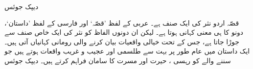 \documentclass[a4paper]{article}
\begin{document}
\RTL
\setlength{\parindent}{0pt}
\setlength{\parskip}{24pt plus 10pt minus 10pt}
\fontsize{36pt}{18pt}
\begin{center}
\fontsize{36pt}{18pt}\notourdubold
دیپک جوئس

\fontsize{12pt}{18pt}\notourdu
قصّہ اردو نثر کی ایک صنف ہے۔ عربی کے لفظ ’قصّہ‘ اور فارسی کے  لفظ  ’داستان‘، دونو کا ہی معنی  کہانی ہوتا ہے۔ لیکن ان دونوں  الفاظ کو نثر کی ایک خاص صنف سے جوڑا جاتا ہے، جس کے تحت خیالی واقعیات بیان کرنے والی رومانی کہانیاں آتی ہیں۔  ایک داستان میں عام طور پر بہت سے طلسمی اور عجیب و غریب واقعات ہوتے ہیں جو سننے والے کو رہسی ، حیرت اور مسرت کا سامان فراہم کرتے ہیں۔
  دیپک جوئس
\end{center}
\end{document}
